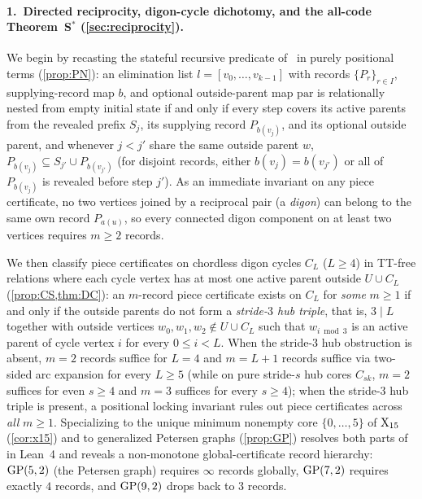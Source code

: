 \paragraph{1.\ Directed reciprocity, digon-cycle dichotomy, and the all-code Theorem~S$^*$ (\cref{sec:reciprocity}).}
We begin by recasting the stateful recursive predicate  of~\cite{SeventhPaper2026} in purely
positional terms (\cref{prop:PN}): an elimination list $l = [v_0, \dots, v_{k-1}]$ with records $\{P_r\}_{r \in I}$,
supplying-record map $b$, and optional outside-parent map $\mathrm{par}$ is relationally nested from empty initial state
if and only if every step covers its active parents from the revealed prefix $S_j$, its supplying record $P_{b(v_j)}$,
and its optional outside parent, and whenever $j < j'$ share the same outside parent $w$, $P_{b(v_j)} \subseteq S_{j'}
\cup P_{b(v_{j'})}$ (for disjoint records, either $b(v_j) = b(v_{j'})$ or all of $P_{b(v_j)}$ is revealed before step
$j'$). As an immediate invariant on any piece certificate, no two vertices joined by a reciprocal pair (a \emph{digon})
can belong to the same own record $P_{a(u)}$, so every connected digon component on at least two vertices requires
$m \ge 2$ records.

We then classify piece certificates on chordless digon cycles $C_L$ ($L \ge 4$) in TT-free relations where each cycle
vertex has at most one active parent outside $U \cup C_L$ (\cref{prop:CS,thm:DC}): an $m$-record piece certificate
exists on $C_L$ for \emph{some} $m \ge 1$ if and only if the outside parents do not form a \emph{stride-$3$ hub triple},
that is, $3 \mid L$ together with outside vertices $w_0, w_1, w_2 \notin U \cup C_L$ such that $w_{i \bmod 3}$ is an
active parent of cycle vertex $i$ for every $0 \le i < L$. When the stride-$3$ hub obstruction is absent, $m = 2$
records suffice for $L = 4$ and $m = L + 1$ records suffice via two-sided arc expansion for every $L \ge 5$ (while on
pure stride-$s$ hub cores $C_{sk}$, $m = 2$ suffices for even $s \ge 4$ and $m = 3$ suffices for every $s \ge 4$); when
the stride-$3$ hub triple is present, a positional locking invariant rules out piece certificates across \emph{all}
$m \ge 1$. Specializing to the unique minimum nonempty core $\{0,\dots,5\}$ of $\mathrm{X}_{15}$ (\cref{cor:x15}) and to generalized
Petersen graphs (\cref{prop:GP}) resolves both parts of~\cite[Remarks~7.3 and~7.5; Section~9.2, Problem~6]{SeventhPaper2026}
in Lean~4 and reveals
a non-monotone global-certificate record hierarchy: $\operatorname{GP}(5,2)$ (the Petersen graph) requires $\infty$ records globally,
$\operatorname{GP}(7,2)$ requires exactly $4$ records, and $\operatorname{GP}(9,2)$ drops back to $3$ records.

